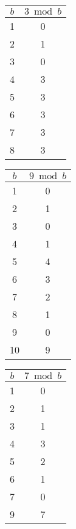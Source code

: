 \noindent
\begin{minipage}{0.32\textwidth}
    \centering
    \begin{tabular}{c|c}
        $b$ & $3 \bmod b$ \\
        \hline
        1   & 0           \\
        2   & 1           \\
        3   & 0           \\
        4   & 3           \\
        5   & 3           \\
        6   & 3           \\
        7   & 3           \\
        8   & 3           \\
    \end{tabular}
\end{minipage}%
\begin{minipage}{0.32\textwidth}
    \centering
    \begin{tabular}{c|c}
        $b$ & $9 \bmod b$ \\
        \hline
        1   & 0           \\
        2   & 1           \\
        3   & 0           \\
        4   & 1           \\
        5   & 4           \\
        6   & 3           \\
        7   & 2           \\
        8   & 1           \\
        9   & 0           \\
        10  & 9           \\
    \end{tabular}
\end{minipage}%
\begin{minipage}{0.32\textwidth}
    \centering
    \begin{tabular}{c|c}
        $b$ & $7 \bmod b$ \\
        \hline
        1   & 0           \\
        2   & 1           \\
        3   & 1           \\
        4   & 3           \\
        5   & 2           \\
        6   & 1           \\
        7   & 0           \\
        9   & 7           \\
    \end{tabular}
\end{minipage}

